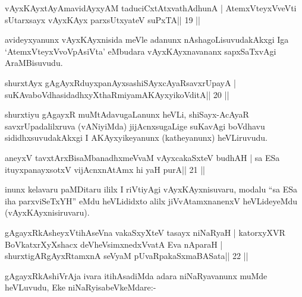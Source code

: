 \begin{shl}
vAyxKAyxtAyAmavidAyxyAM taduciCxtAtxvathAdhunA |
AtemxVteyxVveVti sUtarxsayx vAyxKAyx parxsUtxyateV suPxTA\hfill || 19 ||
\end{shl}

\begin{artha}
avideyxyanunx vAyxKAyxnisida meVle adanunx nAshagoLisuvudakAkxgi Iga `AtemxVteyxVvoVpAsiVta' eMbudara vAyxKAyxnavananx sapxSaTxvAgi AraMBisuvudu.
\end{artha}


\begin{shl}
shurxtAyx gAgAyxRduyxpanAyxsashiSAyxcAyaRsavxrUpayA |
suKAvaboVdhasidadhxyXthaRmiyamAKAyxyikoVditA\hfill || 20 ||
\end{shl}

\begin{artha}
shurxtiyu gAgayxR muMtAdavugaLanunx heVLi, shiSayx-AcAyaR savxrUpadalilxruva (vANiyiMda) jijAcnxsugaLige suKavAgi boVdhavu sididhxsuvudakAkxgi I AKAyxyikeyanunx (katheyanunx) heVLiruvudu.
\end{artha}


\begin{shl}
aneyxV tavxtArxBisaMbanadhxmeVvaM vAyxcakaSxteV budhAH |
sa ESa ituyxpanayxsotxV vijAcnxnAtAmx hi yaH purA\hfill || 21 ||
\end{shl}

\begin{artha}
inunx kelavaru paMDitaru ililx I riVtiyAgi vAyxKAyxnisuvaru, modalu  ``sa ESa iha parxviSeTxYH'' eMdu heVLididxto alilx jiVvAtamxnanenxV heVLideyeMdu (vAyxKAyxnisiruvaru).
\end{artha}


\begin{shl}
gAgayxRkAsheyxVtihAseVna vakaSxyXteV tasayx niNaRyaH |
katorxyXVR BoVkatxrXyXshacx deVheV\s simxnedxVvatA Eva nAparaH |
shurxtigARgAyxRtamxnA seVyaM pUvaRpakaSxmaBASata\hfill || 22 ||
\end{shl}

\begin{artha}
gAgayxRkAshiVrAja ivara itihAsadiMda adara niNaRyavanunx muMde heVLuvudu, Eke  niNaRyisabeVkeMdare:-
\end{artha} 
 
